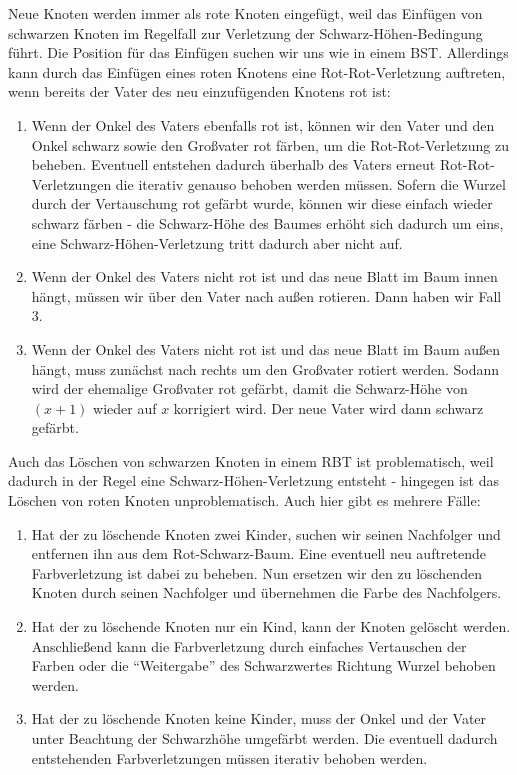 \documentclass[12pt]{article}
\begin{document}
Neue Knoten werden immer als rote Knoten eingefügt, weil das Einfügen von schwarzen Knoten im Regelfall zur Verletzung der Schwarz-Höhen-Bedingung führt. Die Position für das Einfügen suchen wir uns wie in einem BST. Allerdings kann durch das Einfügen eines roten Knotens eine Rot-Rot-Verletzung auftreten, wenn bereits der Vater des neu einzufügenden Knotens rot ist:

\begin{enumerate}
\item Wenn der Onkel des Vaters ebenfalls rot ist, können wir den Vater und den Onkel schwarz sowie den Großvater rot färben, um die Rot-Rot-Verletzung zu beheben. Eventuell entstehen dadurch überhalb des Vaters erneut Rot-Rot-Verletzungen die iterativ genauso behoben werden müssen. Sofern die Wurzel durch der Vertauschung rot gefärbt wurde, können wir diese einfach wieder schwarz färben - die Schwarz-Höhe des Baumes erhöht sich dadurch um eins, eine Schwarz-Höhen-Verletzung tritt dadurch aber nicht auf.
\item Wenn der Onkel des Vaters nicht rot ist und das neue Blatt im Baum innen hängt, müssen wir über den Vater nach außen rotieren. Dann haben wir Fall 3.
\item Wenn der Onkel des Vaters nicht rot ist und das neue Blatt im Baum außen hängt, muss zunächst nach rechts um den Großvater rotiert werden. Sodann wird der ehemalige Großvater rot gefärbt, damit die Schwarz-Höhe von $(x+1)$ wieder auf $x$ korrigiert wird. Der neue Vater wird dann schwarz gefärbt.
\end{enumerate}

Auch das Löschen von schwarzen Knoten in einem RBT ist problematisch, weil dadurch in der Regel eine Schwarz-Höhen-Verletzung entsteht - hingegen ist das Löschen von roten Knoten unproblematisch. Auch hier gibt es mehrere Fälle:

\begin{enumerate}
\item Hat der zu löschende Knoten zwei Kinder, suchen wir seinen Nachfolger und entfernen ihn aus dem Rot-Schwarz-Baum. Eine eventuell neu auftretende Farbverletzung ist dabei zu beheben. Nun ersetzen wir den zu löschenden Knoten durch seinen Nachfolger und übernehmen die Farbe des Nachfolgers.
\item Hat der zu löschende Knoten nur ein Kind, kann der Knoten gelöscht werden. Anschließend kann die Farbverletzung durch einfaches Vertauschen der Farben oder die \enquote{Weitergabe} des Schwarzwertes Richtung Wurzel behoben werden.
\item Hat der zu löschende Knoten keine Kinder, muss der Onkel und der Vater unter Beachtung der Schwarzhöhe umgefärbt werden. Die eventuell dadurch entstehenden Farbverletzungen müssen iterativ behoben werden.
\end{enumerate}
\end{document}
